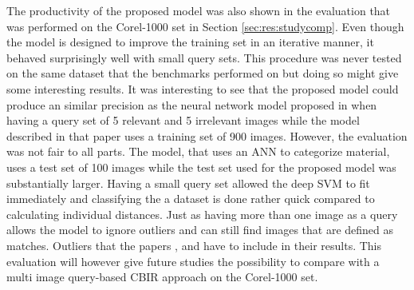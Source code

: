 The productivity of the proposed model was also shown in the evaluation that was performed on the Corel-1000 set in Section \ref{sec:res:studycomp}. Even though the model is designed to improve the training set in an iterative manner, it behaved surprisingly well with small query sets. This procedure was never tested on the same dataset that the benchmarks performed on but doing so might give some interesting results. It was interesting to see that the proposed model could produce an similar precision as the neural network model proposed in \cite{elalami2014new} when having a query set of 5 relevant and 5 irrelevant images while the model described in that paper uses a training set of 900 images. However, the evaluation was not fair to all parts. The model, that uses an ANN to categorize material, uses a test set of 100 images while the test set used for the proposed model was substantially larger. Having a small query set allowed the deep SVM to fit immediately and classifying the a dataset is done rather quick compared to calculating individual distances. Just as having more than one image as a query allows the model to ignore outliers and can still find images that are defined as matches. Outliers that the papers \cite{wang2001simplicity}, \cite{subrahmanyam2013modified} and \cite{nagaraja2015low} have to include in their results. This evaluation will however give future studies the possibility to compare with a multi image query-based CBIR approach on the Corel-1000 set.
